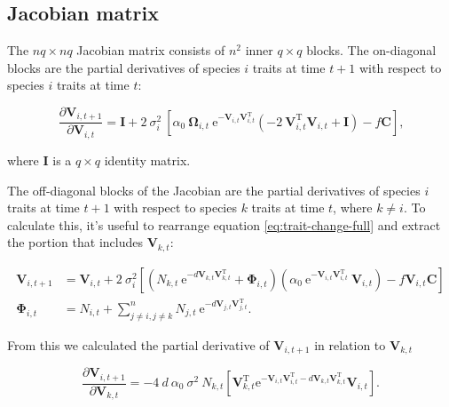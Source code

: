 \subsection*{Jacobian matrix}

The $nq \times nq$ Jacobian matrix consists of $n^2$ inner $q \times q$ blocks.
The on-diagonal blocks are the partial derivatives of species $i$ traits at time $t+1$ with respect
to species $i$ traits at time $t$:

$$
    \frac{ \partial \mathbf{V}_{i,t+1} }{ \partial \mathbf{V}_{i,t} } = \mathbf{I} + 2 ~ \sigma_i^2 ~
        \left[
            \alpha_0 ~ \mathbf{\Omega}_{i,t} ~ \textrm{e}^{ - \mathbf{V}_{i,t} \mathbf{V}_{i,t}^{\textrm{T}} }
            \left(
                -2 ~ \mathbf{V}_{i,t}^{\textrm{T}} \mathbf{V}_{i,t} + \mathbf{I}
            \right) -
            f \mathbf{C}
        \right]
    \textrm{,}
$$

\noindent where $\mathbf{I}$ is a $q \times q$ identity matrix.


The off-diagonal blocks of the Jacobian are the partial derivatives of species $i$
traits at time $t+1$ with respect to species $k$ traits at time $t$, where $k \ne i$.
To calculate this, it's useful to rearrange equation \ref{eq:trait-change-full} and 
extract the portion that includes $\mathbf{V}_{k,t}$:

\begin{equation*}
\begin{split}
    \mathbf{V}_{i,t+1} &= \mathbf{V}_{i,t} + 2 ~ \sigma_i^2
    \left[
        \left(
            N_{k,t} ~ \textrm{e}^{-d \mathbf{V}_{k,t} \mathbf{V}_{k,t}^\textrm{T}} +
            \mathbf{\Phi}_{i,t}
        \right)
        \left(
            \alpha_0 ~ \textrm{e}^{-\mathbf{V}_{i,t}
            \mathbf{V}_{i,t}^\textrm{T}} ~ \mathbf{V}_{i,t}
        \right)
        - f \mathbf{V}_{i,t} \mathbf{C}
    \right] \\
    \mathbf{\Phi}_{i,t} &= N_{i,t} + \sum_{j \ne i, j \ne k}^{n}{
        N_{j,t} ~ \textrm{e}^{-d \mathbf{V}_{j,t}
        \mathbf{V}_{j,t}^{\textrm{T}}} }
    \textrm{.}
\end{split}
\end{equation*}

From this we calculated the partial derivative of $\mathbf{V}_{i,t+1}$ in relation to $\mathbf{V}_{k,t}$

$$
    \frac{ \partial\mathbf{V}_{i,t+1} }{ \partial\mathbf{V}_{k,t}} =
        -4 ~ d ~ \alpha_0 ~ \sigma^2 ~ N_{k,t}
        \left[
            \mathbf{V}_{k,t}^{\textrm{T}}
            \textrm{e}^{
                - \mathbf{V}_{i,t} \mathbf{V}_{i,t}^{\textrm{T}}
                - d \mathbf{V}_{k,t} \mathbf{V}_{k,t}^{\textrm{T}}
            }
            \mathbf{V}_{i,t}
        \right]
    \textrm{.}
$$


